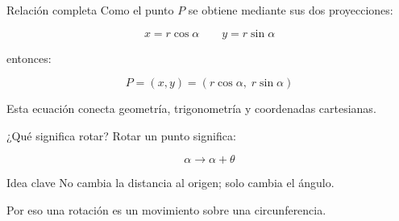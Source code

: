 \documentclass{beamer}
\begin{document}
\begin{frame}{Relación completa}
\small
Como el punto \(P\) se obtiene mediante sus dos proyecciones:

\[
x = r\cos\alpha
\qquad
y = r\sin\alpha
\]

entonces:

\[
P = (x,y) = (r\cos\alpha,\; r\sin\alpha)
\]

\begin{center}
\end{center}

Esta ecuación conecta geometría, trigonometría y coordenadas cartesianas.
\end{frame}

\begin{frame}{¿Qué significa rotar?}
Rotar un punto significa:

\[
\alpha \rightarrow \alpha + \theta
\]

\begin{block}{Idea clave}
No cambia la distancia al origen; solo cambia el ángulo.
\end{block}

Por eso una rotación es un movimiento sobre una circunferencia.
\end{frame}
\end{document}

